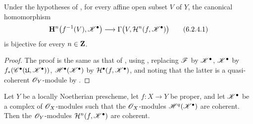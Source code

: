 \begin{corollary}[6.2.4]
\label{III.6.2.4}
Under the hypotheses of , for every affine open
subset $V$ of $Y$, the canonical homomorphism
\[
  \mathbf{H}^n\bigl(f^{-1}(V),\mathscr{K}^\bullet\bigr)
  \longrightarrow
  \Gamma\bigl(V,\mathcal{H}^n(f,\mathscr{K}^\bullet)\bigr)
  \tag{6.2.4.1}\label{III.6.2.4.1}
\]
is bijective for every $n\in\mathbf{Z}$.
\end{corollary}

\begin{proof}
The proof is the same as that of , using
, replacing $\mathscr{F}$ by $\mathscr{K}^\bullet$,
$\mathscr{K}^\bullet$ by
$f_*(\mathscr{C}^\bullet(\mathfrak{U},\mathscr{K}^\bullet))$,
$\mathscr{H}^\bullet(\mathscr{K}^\bullet)$ by
$\mathcal{H}^\bullet(f,\mathscr{K}^\bullet)$, and noting that the latter is a
quasi-coherent $\mathscr{O}_Y$-module by .
\end{proof}

\begin{proposition}[6.2.5]
\label{III.6.2.5}
Let $Y$ be a locally Noetherian prescheme, let $f:X\to Y$ be
proper, and let $\mathscr{K}^\bullet$ be a complex of
$\mathscr{O}_X$-modules such that the $\mathscr{O}_X$-modules
$\mathscr{H}^q(\mathscr{K}^\bullet)$ are coherent.  Then the
$\mathscr{O}_Y$-modules $\mathcal{H}^n(f,\mathscr{K}^\bullet)$ are
coherent.
\end{proposition}

